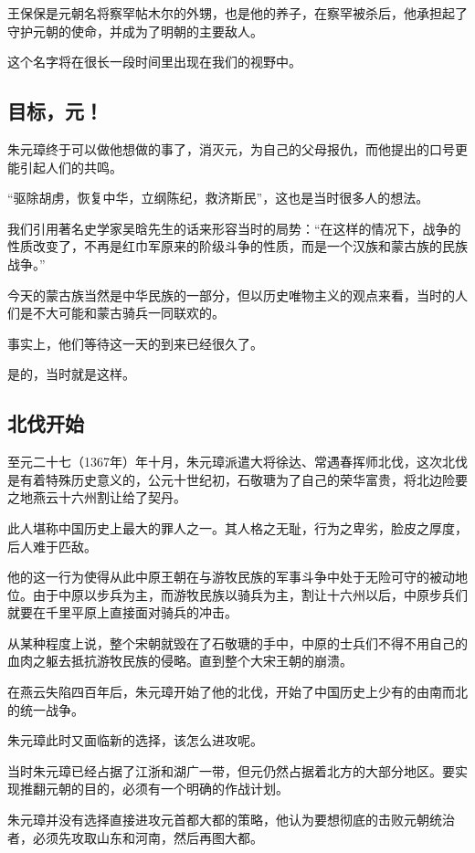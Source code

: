 \begin{multicols}{\theparacolNo}
		王保保是元朝名将察罕帖木尔的外甥，也是他的养子，在察罕被杀后，他承担起了守护元朝的使命，并成为了明朝的主要敌人。

		这个名字将在很长一段时间里出现在我们的视野中。

		\subsection{目标，元！}
		朱元璋终于可以做他想做的事了，消灭元，为自己的父母报仇，而他提出的口号更能引起人们的共鸣。

		“驱除胡虏，恢复中华，立纲陈纪，救济斯民”，这也是当时很多人的想法。

		我们引用著名史学家吴晗先生的话来形容当时的局势：“在这样的情况下，战争的性质改变了，不再是红巾军原来的阶级斗争的性质，而是一个汉族和蒙古族的民族战争。”

		今天的蒙古族当然是中华民族的一部分，但以历史唯物主义的观点来看，当时的人们是不大可能和蒙古骑兵一同联欢的。

		事实上，他们等待这一天的到来已经很久了。

		是的，当时就是这样。

		\subsection{北伐开始}
		至元二十七（1367年）年十月，朱元璋派遣大将徐达、常遇春挥师北伐，这次北伐是有着特殊历史意义的，公元十世纪初，石敬瑭为了自己的荣华富贵，将北边险要之地燕云十六州割让给了契丹。

		此人堪称中国历史上最大的罪人之一。其人格之无耻，行为之卑劣，脸皮之厚度，后人难于匹敌。

		他的这一行为使得从此中原王朝在与游牧民族的军事斗争中处于无险可守的被动地位。由于中原以步兵为主，而游牧民族以骑兵为主，割让十六州以后，中原步兵们就要在千里平原上直接面对骑兵的冲击。

		从某种程度上说，整个宋朝就毁在了石敬瑭的手中，中原的士兵们不得不用自己的血肉之躯去抵抗游牧民族的侵略。直到整个大宋王朝的崩溃。

		在燕云失陷四百年后，朱元璋开始了他的北伐，开始了中国历史上少有的由南而北的统一战争。

		朱元璋此时又面临新的选择，该怎么进攻呢。

		当时朱元璋已经占据了江浙和湖广一带，但元仍然占据着北方的大部分地区。要实现推翻元朝的目的，必须有一个明确的作战计划。

		朱元璋并没有选择直接进攻元首都大都的策略，他认为要想彻底的击败元朝统治者，必须先攻取山东和河南，然后再图大都。


\end{multicols}
